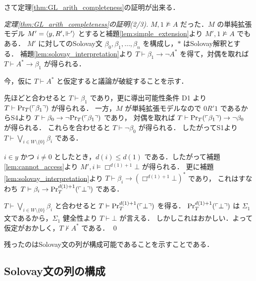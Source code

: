 \documentclass{jlreq}
\begin{document}
さて定理\ref{thm:GL_arith_completeness}の証明が出来る．

\begin{proof}[定理\ref{thm:GL_arith_completeness}の証明(2/3)]
	$M,1 \nvDash A$ だった．$M$ の単純拡張モデル $M' = \langle y, R', \Vdash' \rangle$ とすると補題\ref{lem:simple_extension}より $M',1 \nvDash A$ でもある．
	$M'$ に対してのSolovay文 $\beta_0, \beta_1, \dots, \beta_n$ を構成し，$*$ はSolovay解釈とする．
	補題\ref{lem:solovay_interpretation}より $T \vdash \beta_1 \to \lnot A^*$ を得て，対偶を取れば $T \vdash A^* \to \beta_1$ が得られる．

	今，仮に $T \vdash A^*$ と仮定すると議論が破綻することを示す．

	先ほどと合わせると $T \vdash \beta_1$ であり，更に導出可能性条件 D1 より $T \vdash \mathrm{Pr}_T(\ulcorner \beta_1 \urcorner)$ が得られる．
	一方，$M$ が単純拡張モデルなので $0 R' 1$ であるからS4より $T \vdash \beta_0 \to \lnot \mathrm{Pr}_T(\ulcorner \beta_1 \urcorner)$ であり，
	対偶を取れば $T \vdash \mathrm{Pr}_T(\ulcorner \beta_1 \urcorner) \to \lnot \beta_0$ が得られる．
	これらを合わせると $T \vdash \lnot \beta_0$ が得られる．
	したがってS1より $T \vdash \bigvee_{i \in W \setminus \{0\}} \beta_i$ である．

	$i \in y$ かつ $i \neq 0$ としたとき，$d(i) \leq d(1)$ である．したがって補題 \ref{lem:cannot_access}より
	$M',i \vDash \Box^{d(1) + 1} \bot$ が得られる．
	更に補題\ref{lem:solovay_interpretation}より $T \vdash \beta_i \to (\Box^{d(1) + 1} \bot)^*$ であり，
	これはすなわち $T \vdash \beta_{i} \to \mathrm{Pr}^{d(1) + 1}_T(\ulcorner \bot \urcorner)$ である．

	$T \vdash \bigvee_{i \in W \setminus \{0\}} \beta_i$ と合わせると $T \vdash \mathrm{Pr}^{d(1) + 1}_T(\ulcorner \bot \urcorner)$ を得る．
	$\mathrm{Pr}^{d(1) + 1}_T(\ulcorner \bot \urcorner)$ は $\Sigma_1$ 文であるから，$\Sigma_1$ 健全性より $T \vdash \bot$ が言える．
	しかしこれはおかしい．よって仮定がおかしく，$T \nvdash A^*$ である．
	\qed
\end{proof}

残ったのはSolovay文の列が構成可能であることを示すことである．

\subsection{Solovay文の列の構成}

\printbibliography

\printindex
\end{document}
